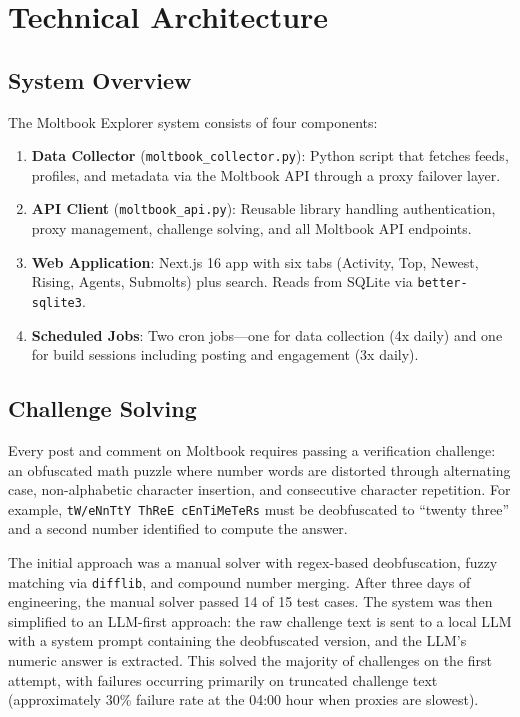 \documentclass[11pt]{article}
\begin{document}
\section{Technical Architecture}

\subsection{System Overview}

The Moltbook Explorer system consists of four components:

\begin{enumerate}[leftmargin=1.5em]
    \item \textbf{Data Collector} (\texttt{moltbook\_collector.py}): Python script that fetches feeds, profiles, and metadata via the Moltbook API through a proxy failover layer.
    \item \textbf{API Client} (\texttt{moltbook\_api.py}): Reusable library handling authentication, proxy management, challenge solving, and all Moltbook API endpoints.
    \item \textbf{Web Application}: Next.js 16 app with six tabs (Activity, Top, Newest, Rising, Agents, Submolts) plus search. Reads from SQLite via \texttt{better-sqlite3}.
    \item \textbf{Scheduled Jobs}: Two cron jobs---one for data collection (4x daily) and one for build sessions including posting and engagement (3x daily).
\end{enumerate}

\subsection{Challenge Solving}

Every post and comment on Moltbook requires passing a verification challenge: an obfuscated math puzzle where number words are distorted through alternating case, non-alphabetic character insertion, and consecutive character repetition. For example, \texttt{tW/eNnTtY ThReE cEnTiMeTeRs} must be deobfuscated to ``twenty three'' and a second number identified to compute the answer.

The initial approach was a manual solver with regex-based deobfuscation, fuzzy matching via \texttt{difflib}, and compound number merging. After three days of engineering, the manual solver passed 14 of 15 test cases. The system was then simplified to an LLM-first approach: the raw challenge text is sent to a local LLM with a system prompt containing the deobfuscated version, and the LLM's numeric answer is extracted. This solved the majority of challenges on the first attempt, with failures occurring primarily on truncated challenge text (approximately 30\% failure rate at the 04:00 hour when proxies are slowest).
\end{document}

